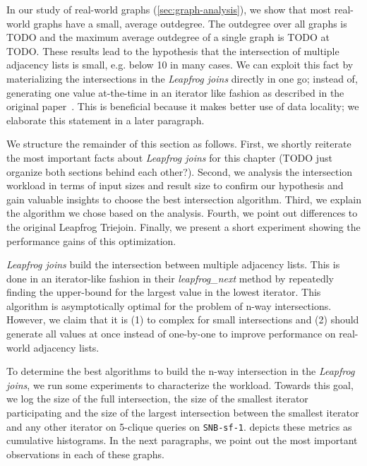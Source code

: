 In our study of real-world graphs (\cref{sec:graph-analysis}), we show that most real-world graphs have a small, average outdegree.
The outdegree over all graphs is TODO and the maximum average outdegree of a single graph
is TODO at TODO.
These results lead to the hypothesis that the intersection of multiple adjacency lists is small, e.g. below 10 in many cases.
We can exploit this fact by materializing the intersections in the \textit{Leapfrog joins} directly
in one go; instead of, generating one value at-the-time in an iterator like fashion as described in the
original paper~\cite{leapfrog}.
This is beneficial because it makes better use of data locality; we elaborate this statement in a later
paragraph.

We structure the remainder of this section as follows.
First, we shortly reiterate the most important facts about \textit{Leapfrog joins} for this chapter (TODO just organize both sections
behind each other?).
Second, we analysis the intersection workload in terms of input sizes and result size to confirm our hypothesis
and gain valuable insights to choose the best intersection algorithm.
Third, we explain the algorithm we chose based on the analysis.
Fourth, we point out differences to the original Leapfrog Triejoin.
Finally, we present a short experiment showing the performance gains of this optimization.

\textit{Leapfrog joins} build the intersection between multiple adjacency lists.
This is done in an iterator-like fashion in their \textit{leapfrog\_next} method by repeatedly finding the upper-bound for the largest
value in the lowest iterator.
This algorithm is asymptotically optimal for the problem of n-way intersections.
However, we claim that it is (1) to complex for small intersections and (2) should generate all values at once instead of one-by-one to
improve performance on real-world adjacency lists.

To determine the best algorithms to build the n-way intersection in the \textit{Leapfrog joins},
we run some experiments to characterize the workload.
Towards this goal, we log the size of the full intersection, the size of the smallest iterator participating
and the size of the largest intersection between the smallest iterator and any other iterator on 5-clique queries on \texttt{SNB-sf-1}.
 depicts these metrics as cumulative histograms.
In the next paragraphs, we point out the most important observations in each of these graphs.

